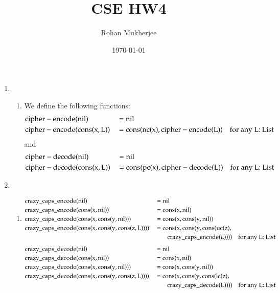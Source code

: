 \documentclass[12pt]{article}
\title{CSE HW4}
\date{\today}
\author{Rohan Mukherjee}
\theoremstyle{definitionstyle}
\begin{document}
    \maketitle
    \begin{enumerate}[leftmargin=\labelsep]
        \item \begin{enumerate}[label=(\alph*)]
            \item We define the following functions:
            \[\begin{aligned}
                &\rm cipher-encode(nil) &&= \rm nil \\
                &\rm cipher-encode(cons(x, L)) &&= \rm cons(nc(x), cipher-encode(L)) && \text{for any L: List}
            \end{aligned}\]
            and
            \[\begin{aligned}
                &\rm cipher-decode(nil) &&= \rm nil \\
                &\rm cipher-decode(cons(x, L)) &&= \rm cons(pc(x), cipher-decode(L)) && \text{for any L: List}
            \end{aligned}\]
        \end{enumerate}

        \newpage
        \item \begin{enumerate}[label=(\alph*)]
            \item \[\begin{aligned}
                &\rm crazy\_caps\_encode(nil) &&= \rm nil \\
                &\rm crazy\_caps\_encode(cons(x, nil)) &&= \rm cons(x, nil) \\
                &\rm crazy\_caps\_encode(cons(x, cons(y, nil))) &&= \rm cons(x, cons(y, nil)) \\
                &\rm crazy\_caps\_encode(cons(x, cons(y, cons(z, L)))) &&= \rm cons(x, cons(y, cons(uc(z), \\ &&& \qquad \mathrm{crazy\_caps\_encode}(L)))) && \text{for any L: List}
            \end{aligned}\]
            \[\begin{aligned}
                &\rm crazy\_caps\_decode(nil) &&= \rm nil \\
                &\rm crazy\_caps\_decode(cons(x, nil)) &&= \rm cons(x, nil) \\
                &\rm crazy\_caps\_decode(cons(x, cons(y, nil))) &&= \rm cons(x, cons(y, nil)) \\
                &\rm crazy\_caps\_decode(cons(x, cons(y, cons(z, L)))) &&= \rm cons(x, cons(y, cons(lc(z),\\&&& \qquad \rm crazy\_caps\_decode(L)))) && \text{for any L: List}
            \end{aligned}\]
        \end{enumerate}


\end{enumerate}
\end{document}
